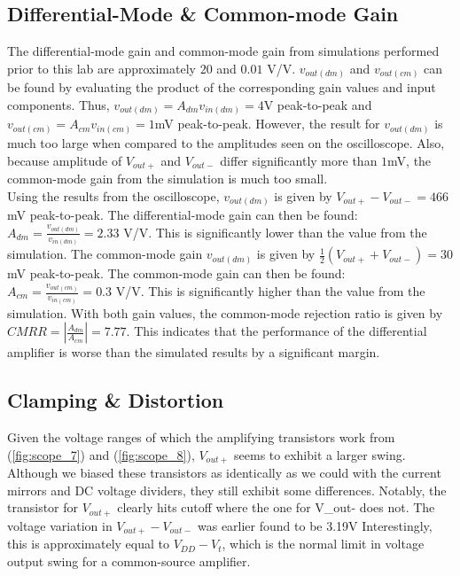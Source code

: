 \subsection{Differential-Mode \& Common-mode Gain}

The differential-mode gain and common-mode gain from simulations performed prior to this lab are approximately $20$ and $0.01$ \si{\volt}/\si{\volt}.
$v_{out(dm)}$ and $v_{out(cm)}$ can be found by evaluating the product of the corresponding gain values and input components.
Thus, $v_{out(dm)} = A_{dm}v_{in(dm)} = 4$\si{\volt} peak-to-peak and $v_{out(cm)} = A_{cm}v_{in(cm)} = 1$\si{\milli\volt} peak-to-peak.
However, the result for $v_{out(dm)}$ is much too large when compared to the amplitudes seen on the oscilloscope.
Also, because amplitude of $V_{out+}$ and $V_{out-}$ differ significantly more than $1$\si{\milli\volt}, the common-mode gain from the simulation is much too small.\\

Using the results from the oscilloscope, $v_{out(dm)}$ is given by $V_{out+} - V_{out-} = 466$\si{\milli\volt} peak-to-peak.
The differential-mode gain can then be found: $A_{dm} = \frac{v_{out(dm)}}{v_{in(dm)}} = 2.33$ \si{\volt}/\si{\volt}.
This is significantly lower than the value from the simulation.
The common-mode gain $v_{out(dm)}$ is given by $\frac{1}{2}(V_{out+} + V_{out-}) = 30$\si{\milli\volt} peak-to-peak.
The common-mode gain can then be found: $A_{cm} = \frac{v_{out(cm)}}{v_{in(cm)}} = 0.3$ \si{\volt}/\si{\volt}.
This is significantly higher than the value from the simulation.
With both gain values, the common-mode rejection ratio is given by $CMRR = |\frac{A_{dm}}{A_{cm}}| = 7.77$.
This indicates that the performance of the differential amplifier is worse than the simulated results by a significant margin. \\

\subsection{Clamping \& Distortion}

Given the voltage ranges of which the amplifying transistors work from (\ref{fig:scope_7}) and (\ref{fig:scope_8}), $V_{out+}$ seems to exhibit a larger swing.
Although we biased these transistors as identically as we could with the current mirrors and DC voltage dividers, they still exhibit some differences.
Notably, the transistor for $V_{out+}$ clearly hits cutoff where the one for V_{out-} does not.
The voltage variation in $V_{out+} - V_{out-}$ was earlier found to be 3.19\si{\volt}
Interestingly, this is approximately equal to $V_{DD} - V_{t}$, which is the normal limit in voltage output swing for a common-source amplifier.

